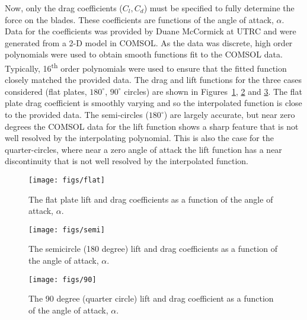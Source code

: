 Now, only the drag coefficients ($C_l,C_d$) must be specified to fully
determine the force on the blades. These coefficients are functions of
the angle of attack, $\alpha$. Data for the coefficients was provided
by Duane McCormick at UTRC and were generated from a 2-D model in
COMSOL. As the data was discrete, high order polynomials were used
to obtain smooth functions fit to the COMSOL data. Typically,
16\textsuperscript{th} order polynomials were used to 
ensure that the fitted function closely matched the provided
data. The drag and lift functions for the three cases considered (flat
plates, $180^{\circ}$, $90^{\circ}$ circles) are shown in 
Figures~\ref{fig:flat_plate_drag}, \ref{fig:semi_drag} and
\ref{fig:90_drag}. The flat plate drag coefficient is smoothly
varying and so the interpolated function is close to the provided
data. The semi-circles ($180^{\circ}$) are largely accurate, but near
zero degrees the COMSOL data for the lift function shows a sharp feature
that is not well resolved by the interpolating polynomial. This is also
the case for the quarter-circles, where near a zero angle of attack the
lift function has a near discontinuity that is not well resolved by the
interpolated function. 


\begin{figure}[!htb]
  \begin{center}
    \texttt{[image: figs/flat]}
    \caption{The flat plate lift and drag coefficients as a function of the angle of attack, $\alpha$.} 
    \label{fig:flat_plate_drag}
  \end{center}
\end{figure}

\begin{figure}[!htb]
  \begin{center}
    \texttt{[image: figs/semi]}
    \caption{The semicircle (180 degree) lift and drag coefficients as a function of the angle of attack, $\alpha$.} 
    \label{fig:semi_drag}
  \end{center}
\end{figure}

\begin{figure}[!htb]
  \begin{center}
    \texttt{[image: figs/90]}
    \caption{The 90 degree (quarter circle) lift and drag coefficient as a function of the angle of attack, $\alpha$.} 
    \label{fig:90_drag}
  \end{center}
\end{figure}

